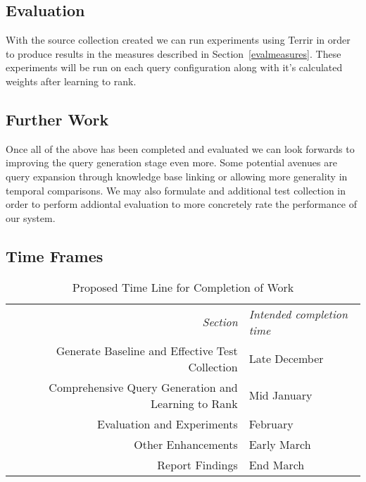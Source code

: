 \documentclass{mprop}
\begin{document}
\subsection{Evaluation}
With the source collection created we can run experiments using Terrir in order to produce results in the measures described in Section~\ref{evalmeasures}. These experiments will be run on each query configuration along with it's calculated weights after learning to rank.

\subsection{Further Work}
Once all of the above has been completed and evaluated we can look forwards to improving the query generation stage even more. Some potential avenues are query expansion through knowledge base linking or allowing more generality in temporal comparisons. We may also formulate and additional test collection in order to perform addiontal evaluation to more concretely rate the performance of our system.

\subsection{Time Frames}
\begin{table}[H]\label{table:time-allocation}
\begin{center}
\begin{tabular}{r|l}
    \emph{Section} & \emph{Intended completion time}\\
    Generate Baseline and Effective Test Collection & Late December\\
    Comprehensive Query Generation and Learning to Rank & Mid January\\
    Evaluation and Experiments & February\\
    Other Enhancements & Early March\\
    Report Findings & End March\\
\end{tabular}\par
    \caption{Proposed Time Line for Completion of Work}
\end{center}
\end{table}



\end{document}
